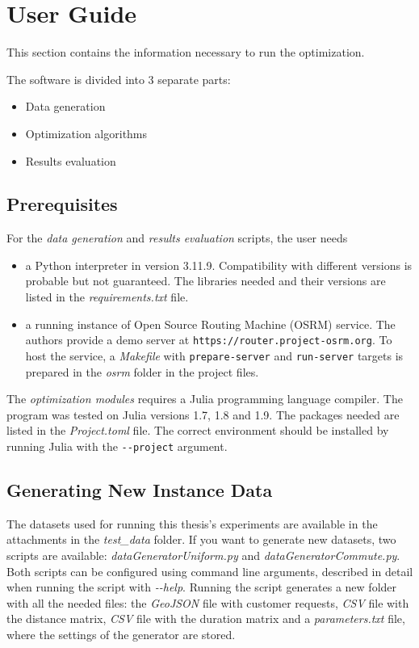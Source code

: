 \chapter{User Guide}\label{app:user}

This section contains the information necessary to run the optimization.

The software is divided into 3 separate parts:

\begin{itemize}
    \setlength\itemsep{0pt}
    \item Data generation
    \item Optimization algorithms
    \item Results evaluation
\end{itemize}

\section{Prerequisites}

For the \textit{data generation} and \textit{results evaluation} scripts, the user needs
\begin{itemize}
    \setlength\itemsep{0pt}
    \item a Python interpreter in version 3.11.9. Compatibility with different versions is probable but not guaranteed. The libraries needed and their versions are listed in the \textit{requirements.txt} file. 
    \item a running instance of Open Source Routing Machine (OSRM) \cite{luxen-vetter-2011} service. The authors provide a demo server at \texttt{https://router.project-osrm.org}. To host the service, a \textit{Makefile} with \texttt{prepare-server} and \texttt{run-server} targets is prepared in the \textit{osrm} folder in the project files.
\end{itemize}

The \textit{optimization modules} requires a Julia programming language compiler. The program was tested on Julia versions 1.7, 1.8 and 1.9. The packages needed are listed in the \textit{Project.toml} file. The correct environment should be installed by running Julia with the \texttt{-{}-project} argument.

\section{Generating New Instance Data}

The datasets used for running this thesis's experiments are available in the attachments in the \textit{test\_data} folder. If you want to generate new datasets, two scripts are available: \textit{dataGeneratorUniform.py} and \textit{dataGeneratorCommute.py}. Both scripts can be configured using command line arguments, described in detail when running the script with \textit{-{}-help}. Running the script generates a new folder with all the needed files: the \textit{GeoJSON} file with customer requests, \textit{CSV} file with the distance matrix, \textit{CSV} file with the duration matrix and a \textit{parameters.txt} file, where the settings of the generator are stored.

